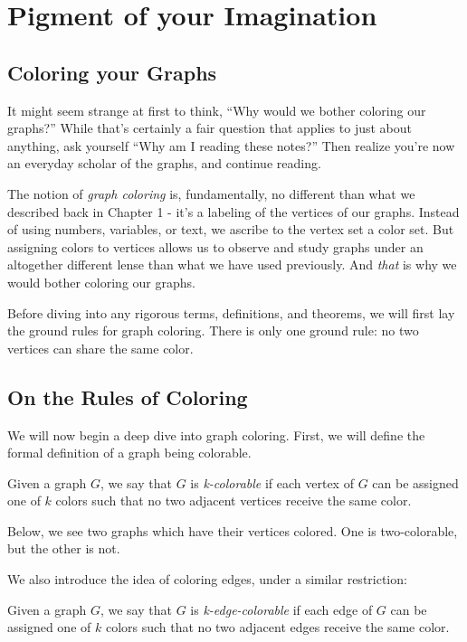 \chapter{Pigment of your Imagination}
\section{Coloring your Graphs}
It might seem strange at first to think, ``Why would we bother coloring our graphs?'' While that's certainly a fair question that applies to just about anything, ask yourself ``Why am I reading these notes?'' Then realize you're now an everyday scholar of the graphs, and continue reading.

The notion of \textit{graph coloring} is, fundamentally, no different than what we described back in Chapter 1 - it's a labeling of the vertices of our graphs. Instead of using numbers, variables, or text, we ascribe to the vertex set a color set. But assigning colors to vertices allows us to observe and study graphs under an altogether different lense than what we have used previously. And \textit{that} is why we would bother coloring our graphs.

Before diving into any rigorous terms, definitions, and theorems, we will first lay the ground rules for graph coloring. There is only one ground rule: no two vertices can share the same color.

\section{On the Rules of Coloring}
We will now begin a deep dive into graph coloring. First, we will define the formal definition of a graph being colorable.

\begin{definition}[K-Colorable]
    Given a graph $G$, we say that $G$ is \textit{k-colorable} if each vertex of $G$ can be assigned one of $k$ colors such that no two adjacent vertices receive the same color.
\end{definition}

Below, we see two graphs which have their vertices colored. One is two-colorable, but the other is not.


We also introduce the idea of coloring edges, under a similar restriction:

\begin{definition}
    Given a graph $G$, we say that $G$ is \textit{k-edge-colorable} if each edge of $G$ can be assigned one of $k$ colors such that no two adjacent edges receive the same color.
\end{definition}

